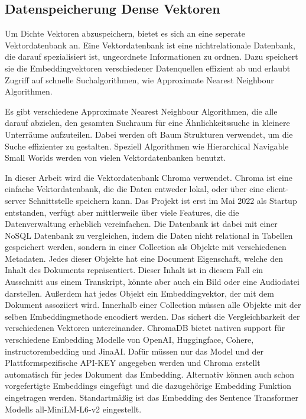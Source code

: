 \subsection{Datenspeicherung Dense Vektoren}

Um Dichte Vektoren abzuspeichern, bietet es sich an eine seperate Vektordatenbank an.
Eine Vektordatenbank ist eine nichtrelationale Datenbank, die darauf spezialisiert ist, ungeordnete Informationen zu ordnen.
Dazu speichert sie die Embeddingvektoren verschiedener Datenquellen effizient ab und erlaubt Zugriff auf schnelle Suchalgorithmen, wie Approximate Nearest Neighbour Algorithmen.

Es gibt verschiedene Approximate Nearest Neighbour Algorithmen, die alle darauf abzielen, den gesamten Suchraum für eine Ähnlichkeitssuche in kleinere Unterräume aufzuteilen.
Dabei werden oft Baum Strukturen verwendet, um die Suche effizienter zu gestalten.
Speziell Algorithmen wie Hierarchical Navigable Small Worlds werden von vielen Vektordatenbanken benutzt.



In dieser Arbeit wird die Vektordatenbank Chroma verwendet. 
Chroma ist eine einfache Vektordatenbank, die die Daten entweder lokal, oder über eine client-server Schnittstelle speichern kann.
Das Projekt ist erst im Mai 2022 als Startup entstanden, verfügt aber mittlerweile über viele Features, die die Datenverwaltung erheblich vereinfachen.
Die Datenbank ist dabei mit einer NoSQL Datenbank zu vergleichen, indem die Daten nicht relational in Tabellen gespeichert werden, sondern in einer Collection als Objekte mit verschiedenen Metadaten.
Jedes dieser Objekte hat eine Document Eigenschaft, welche den Inhalt des Dokuments repräsentiert.
Dieser Inhalt ist in diesem Fall ein Ausschnitt aus einem Transkript, könnte aber auch ein Bild oder eine Audiodatei darstellen.
Außerdem hat jedes Objekt ein Embeddingvektor, der mit dem Dokument assoziiert wird. 
Innerhalb einer Collection müssen alle Objekte mit der selben Embeddingmethode encodiert werden.
Das sichert die Vergleichbarkeit der verschiedenen Vektoren untereinander.
ChromaDB bietet nativen support für verschiedene Embedding Modelle von OpenAI, Huggingface, Cohere, instructorembedding und JinaAI.
Dafür müssen nur das Model und der Plattformspezifische API-KEY angegeben werden und Chroma erstellt automatisch für jedes Dokument das Embedding.
Alternativ können auch schon vorgefertigte Embeddings eingefügt und die dazugehörige Embedding Funktion eingetragen werden.
Standartmäßig ist das Embedding des Sentence Transformer Modells all-MiniLM-L6-v2 eingestellt.

